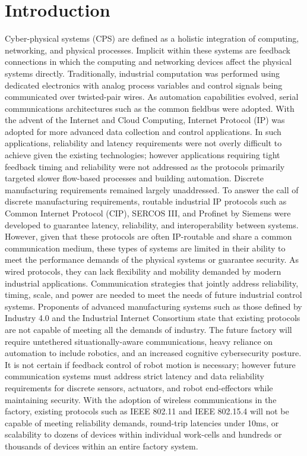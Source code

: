 \documentclass{article}
\begin{document}
	\section{Introduction}
Cyber-physical systems (CPS) are defined as a holistic integration of computing, networking, and physical processes.  Implicit within these systems are feedback connections in which the computing and networking devices affect the physical systems directly.  Traditionally, industrial computation was performed using dedicated electronics with analog process variables and control signals being communicated over twisted-pair wires.  As automation capabilities evolved, serial communications architectures such as the common fieldbus were adopted.  With the advent of the Internet and Cloud Computing, Internet Protocol (IP) was adopted for more advanced data collection and control applications.  In such applications, reliability and latency requirements were not overly difficult to achieve given the existing technologies; however applications requiring tight feedback timing and reliability were not addressed as the protocols primarily targeted slower flow-based processes and building automation.  Discrete manufacturing requirements remained largely unaddressed.  To answer the call of discrete manufacturing requirements, routable industrial IP protocols such as Common Internet Protocol (CIP), SERCOS III, and Profinet by Siemens were developed to guarantee latency, reliability, and interoperability between systems.  However, given that these protocols are often IP-routable and share a common communication medium, these types of systems are limited in their ability to meet the performance demands of the physical systems or guarantee security.   As wired protocols, they can lack flexibility and mobility demanded by modern industrial applications.
Communication strategies that jointly address reliability, timing, scale, and power are needed to meet the needs of future industrial control systems.  Proponents of advanced manufacturing systems such as those defined by Industry 4.0 and the Industrial Internet Consortium state that existing protocols are not capable of meeting all the demands of industry.  The future factory will require untethered situationally-aware communications, heavy reliance on automation to include robotics, and an increased cognitive cybersecurity posture.  It is not certain if feedback control of robot motion is necessary; however future communication systems must address strict latency and data reliability requirements for discrete sensors, actuators, and robot end-effectors while maintaining security.  With the adoption of wireless communications in the factory, existing protocols such as IEEE 802.11 and IEEE 802.15.4 will not be capable of meeting reliability demands, round-trip latencies under 10ms, or scalability to dozens of devices within individual work-cells and hundreds or thousands of devices within an entire factory system.    
\end{document}

